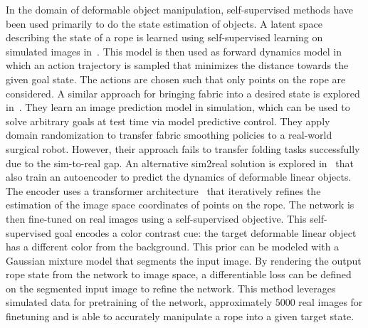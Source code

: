 \documentclass[\home/main.tex]{subfiles}
\begin{document}
In the domain of deformable object manipulation, self-supervised methods have been used primarily to do the state estimation of objects. A latent space describing the state of a rope is learned using self-supervised learning on simulated images in~\autocite{yan2020learning}. This model is then used as forward dynamics model in which an action trajectory is sampled that minimizes the distance towards the given goal state. The actions are chosen such that only points on the rope are considered. A similar approach for bringing fabric into a desired state is explored in~\autocite{fabric_vsf_2020}. They learn an image prediction model in simulation, which can be used to solve arbitrary goals at test time via model predictive control. They apply domain randomization to transfer fabric smoothing policies to a real-world surgical robot. However, their approach fails to transfer folding tasks successfully due to the sim-to-real gap. An alternative sim2real solution is explored in~\autocite{Mengyuan2020} that also train an autoencoder to predict the dynamics of deformable linear objects. The encoder uses a transformer architecture~\autocite{vaswani2017attention} that iteratively refines the estimation of the image space coordinates of points on the rope. The network is then fine-tuned on real images using a self-supervised objective. This self-supervised goal encodes a color contrast cue: the target deformable linear object has a different color from the background. This prior can be modeled with a Gaussian mixture model that segments the input image. By rendering the output rope state from the network to image space, a differentiable loss can be defined on the segmented input image to refine the network. This method leverages simulated data for pretraining of the network, approximately $5000$ real images for finetuning and is able to accurately manipulate a rope into a given target state.
\end{document}
